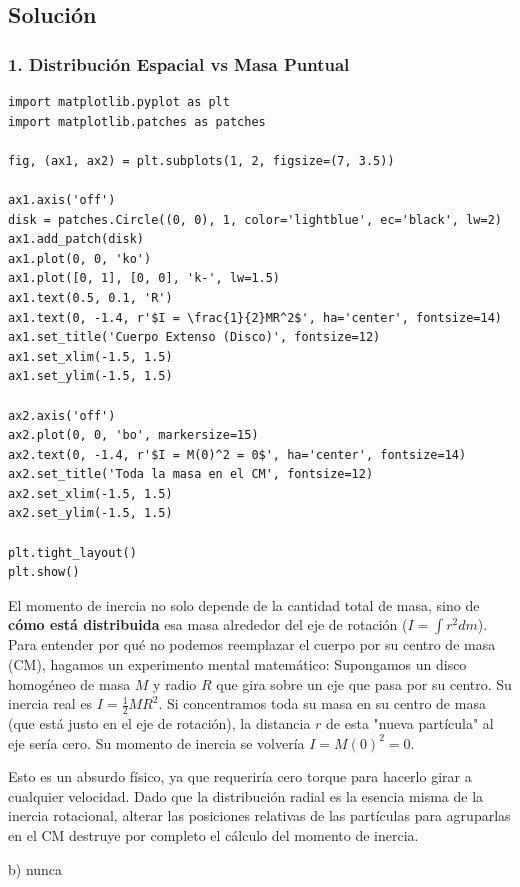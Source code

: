 \documentclass[12pt, a4paper]{article}
\begin{document}
\subsection*{Solución}

\subsubsection*{1. Distribución Espacial vs Masa Puntual}

\begin{verbatim}
import matplotlib.pyplot as plt
import matplotlib.patches as patches

fig, (ax1, ax2) = plt.subplots(1, 2, figsize=(7, 3.5))

ax1.axis('off')
disk = patches.Circle((0, 0), 1, color='lightblue', ec='black', lw=2)
ax1.add_patch(disk)
ax1.plot(0, 0, 'ko')
ax1.plot([0, 1], [0, 0], 'k-', lw=1.5)
ax1.text(0.5, 0.1, 'R')
ax1.text(0, -1.4, r'$I = \frac{1}{2}MR^2$', ha='center', fontsize=14)
ax1.set_title('Cuerpo Extenso (Disco)', fontsize=12)
ax1.set_xlim(-1.5, 1.5)
ax1.set_ylim(-1.5, 1.5)

ax2.axis('off')
ax2.plot(0, 0, 'bo', markersize=15)
ax2.text(0, -1.4, r'$I = M(0)^2 = 0$', ha='center', fontsize=14)
ax2.set_title('Toda la masa en el CM', fontsize=12)
ax2.set_xlim(-1.5, 1.5)
ax2.set_ylim(-1.5, 1.5)

plt.tight_layout()
plt.show()
\end{verbatim}

El momento de inercia no solo depende de la cantidad total de masa, sino de \textbf{cómo está distribuida} esa masa alrededor del eje de rotación ($I = \int r^2 dm$). 
Para entender por qué no podemos reemplazar el cuerpo por su centro de masa (CM), hagamos un experimento mental matemático:
Supongamos un disco homogéneo de masa $M$ y radio $R$ que gira sobre un eje que pasa por su centro. Su inercia real es $I = \frac{1}{2}MR^2$.
Si concentramos toda su masa en su centro de masa (que está justo en el eje de rotación), la distancia $r$ de esta "nueva partícula" al eje sería cero. Su momento de inercia se volvería $I = M(0)^2 = 0$. 

Esto es un absurdo físico, ya que requeriría cero torque para hacerlo girar a cualquier velocidad. Dado que la distribución radial es la esencia misma de la inercia rotacional, alterar las posiciones relativas de las partículas para agruparlas en el CM destruye por completo el cálculo del momento de inercia.

\begin{tcolorbox}[colback=green!5!white, colframe=green!50!black, title=Respuesta Final]
\centering \Large b) nunca
\end{tcolorbox}
\end{document}
